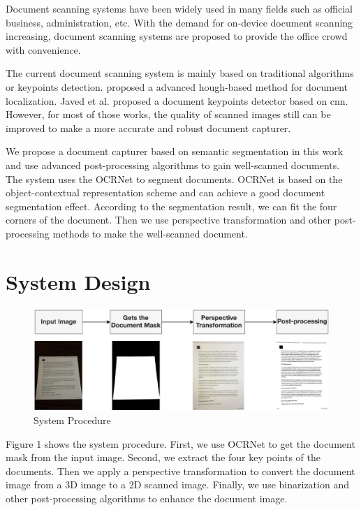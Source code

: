 \documentclass[10pt, conference, compsocconf]{IEEEtran}
\begin{document}

Document scanning systems have been widely used in many fields such as official business, administration, etc. 
With the demand for on-device document scanning increasing, document scanning systems are proposed to provide the office crowd with convenience. 

The current document scanning system is mainly based on traditional algorithms or keypoints detection.  \cite{Tropin2021AdvancedHM} proposed a advanced hough-based method for document localization. Javed et al.\cite{javed2017real} proposed a document keypoints detector based on cnn.
However, for most of those works, the quality of scanned images still can be improved to make a more accurate and robust document capturer.

We propose a document capturer based on semantic segmentation in this work and use advanced post-processing algorithms to gain well-scanned documents.
The system uses the OCRNet\cite{yuan2020object} to segment documents. 
OCRNet is based on the object-contextual representation scheme and can achieve a good document segmentation effect. According to the segmentation result, we can fit the four corners of the document. Then we use perspective transformation\cite{lin2010image} and other post-processing methods to make the well-scanned document.

\section{System Design}

\begin{figure}[!h]
\centering
\includegraphics[width=3.2 in]{./Assets/FlowChart.jpg}
\caption{System Procedure}
\end{figure}



Figure 1 shows the system procedure.
First, we use OCRNet\cite{yuan2020object} to get the document mask from the input image.
Second, we extract the four key points of the documents.
Then we apply a perspective transformation to convert the document image from a 3D image to a 2D scanned image.
Finally, we use binarization and other post-processing algorithms to enhance the document image. 
\end{document}
